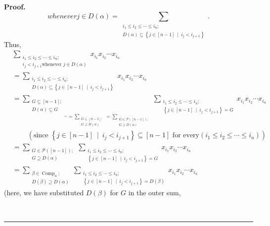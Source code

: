 \documentclass[numbers=enddot,12pt,final,onecolumn,notitlepage,abstracton]{scrartcl}
\theoremstyle{definition}
\newenvironment{proof}[1][Proof]{\noindent\textbf{#1.} }{\ \rule{0.5em}{0.5em}}
\let\sumnonlimits\sum
\renewcommand{\sum}{\sumnonlimits\limits}
\newenvironment{verlong}{}{}
\begin{document}
\begin{verlong}
\begin{footnotesize}
\begin{proof}
\[{{{whenever }j\in D\left(  \alpha\right)  }}=\sum_{\substack{i_{1}\leq i_{2}%
\leq\cdots\leq i_{n};\\D\left(  \alpha\right)  \subseteq\left\{  j\in\left[
n-1\right]  \ \mid\ i_{j}<i_{j+1}\right\}  }}.
\]
Thus,%
\begin{align*}
&  \sum_{\substack{i_{1}\leq i_{2}\leq\cdots\leq i_{n};\\i_{j}<i_{j+1}\text{
whenever }j\in D\left(  \alpha\right)  }}x_{i_{1}}x_{i_{2}}\cdots x_{i_{n}}\\
&  =\sum_{\substack{i_{1}\leq i_{2}\leq\cdots\leq i_{n};\\D\left(
\alpha\right)  \subseteq\left\{  j\in\left[  n-1\right]  \ \mid\ i_{j}%
<i_{j+1}\right\}  }}x_{i_{1}}x_{i_{2}}\cdots x_{i_{n}}\\
&  =\underbrace{\sum_{\substack{G\subseteq\left[  n-1\right]  ;\\D\left(
\alpha\right)  \subseteq G}}}_{=\sum_{\substack{G\subseteq\left[  n-1\right]
;\\G\supseteq D\left(  \alpha\right)  }}=\sum_{\substack{G\in\mathcal{P}%
\left(  \left[  n-1\right]  \right)  ;\\G\supseteq D\left(  \alpha\right)  }%
}}\sum_{\substack{i_{1}\leq i_{2}\leq\cdots\leq i_{n};\\\left\{  j\in\left[
n-1\right]  \ \mid\ i_{j}<i_{j+1}\right\}  =G}}x_{i_{1}}x_{i_{2}}\cdots
x_{i_{n}}\\
&  \ \ \ \ \ \ \ \ \ \ \left(  \text{since }\left\{  j\in\left[  n-1\right]
\ \mid\ i_{j}<i_{j+1}\right\}  \subseteq\left[  n-1\right]  \text{ for every
}\left(  i_{1}\leq i_{2}\leq\cdots\leq i_{n}\right)  \right) \\
&  =\sum_{\substack{G\in\mathcal{P}\left(  \left[  n-1\right]  \right)
;\\G\supseteq D\left(  \alpha\right)  }}\sum_{\substack{i_{1}\leq i_{2}%
\leq\cdots\leq i_{n};\\\left\{  j\in\left[  n-1\right]  \ \mid\ i_{j}%
<i_{j+1}\right\}  =G}}x_{i_{1}}x_{i_{2}}\cdots x_{i_{n}}\\
&  =\sum_{\substack{\beta\in\operatorname*{Comp}\nolimits_{n};\\D\left(
\beta\right)  \supseteq D\left(  \alpha\right)  }}\sum_{\substack{i_{1}\leq
i_{2}\leq\cdots\leq i_{n};\\\left\{  j\in\left[  n-1\right]  \ \mid
\ i_{j}<i_{j+1}\right\}  =D\left(  \beta\right)  }}x_{i_{1}}x_{i_{2}}\cdots
x_{i_{n}}%
\end{align*}
(here, we have substituted $D\left(  \beta\right)  $ for $G$ in the outer sum,

\end{proof}
\end{footnotesize}
\end{verlong}
\end{document}
